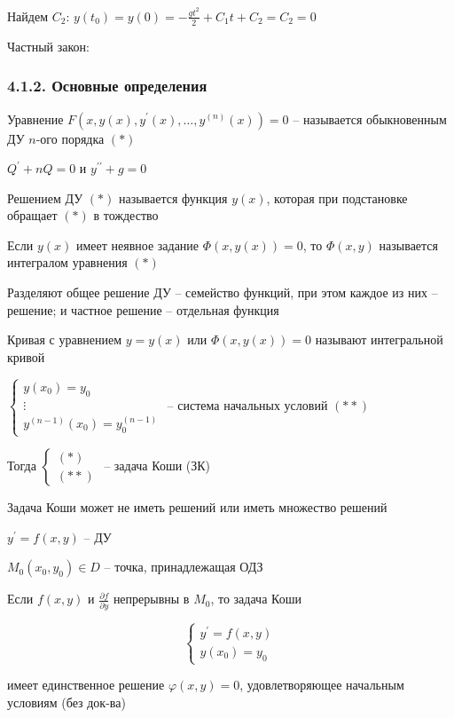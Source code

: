 \documentclass[12pt]{article}
\begin{document}
    Найдем $C_2$: $y(t_0) = y(0) = -\frac{gt^2}{2} + C_1 t + C_2 = C_2 = 0$

    Частный закон: 

    \subsubsection{4.1.2. Основные определения}

    \hypertarget{differentialequationdefinition}{}

     Уравнение $F(x, y(x), y^\prime(x), \dots, y^{(n)}(x)) = 0$ -- называется обыкновенным ДУ $n$-ого порядка $(*)$

    \Exs $Q^\prime + nQ = 0$ и $y^{\prime\prime} + g = 0$

     Решением ДУ $(*)$ называется функция $y(x)$, которая при подстановке обращает $(*)$ в тождество

     Если $y(x)$ имеет неявное задание $\Phi(x, y(x)) = 0$, то $\Phi(x, y)$ называется интегралом уравнения $(*)$

    \Notas Разделяют общее решение ДУ -- семейство функций, при этом каждое из них -- решение; и
    частное решение -- отдельная функция

     Кривая с уравнением $y = y(x)$ или $\Phi(x, y(x)) = 0$ называют интегральной кривой

    \hypertarget{problemCauchy}{}

     $\begin{cases}y(x_0) = y_0 \\ \vdots \\ y^{(n - 1)}(x_0) = y_0^{(n - 1)}\end{cases}$ -- система начальных условий $(**)$

    Тогда $\begin{cases}(*) \\ (**)\end{cases}$ -- задача Коши (ЗК)

    \Notas Задача Коши может не иметь решений или иметь множество решений

    \begin{MyTheorem}
        \Ths $y^\prime = f(x, y)$ -- ДУ

        $M_0(x_0, y_0) \in D$ -- точка, принадлежащая ОДЗ

        Если $f(x, y)$ и $\frac{\partial f}{\partial y}$ непрерывны в $M_0$, то задача Коши

        \[\begin{cases}y^\prime = f(x, y) \\ y(x_0) = y_0\end{cases}\]

        имеет единственное решение $\varphi(x, y) = 0$, удовлетворяющее начальным условиям (без док-ва)
    \end{MyTheorem}
\end{document}
